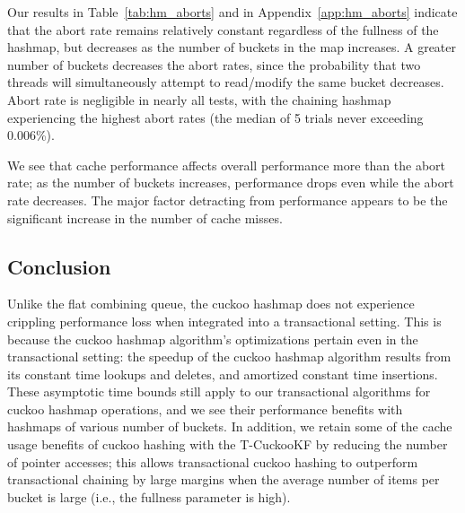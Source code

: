     Our results in Table~\ref{tab:hm_aborts} and in Appendix~\ref{app:hm_aborts} indicate that the abort rate remains relatively constant regardless of the fullness of the hashmap, but decreases as the number of buckets in the map increases. A greater number of buckets decreases the abort rates, since the probability that two threads will simultaneously attempt to read/modify the same bucket decreases. Abort rate is negligible in nearly all tests, with the chaining hashmap experiencing the highest abort rates (the median of 5 trials never exceeding 0.006\%).

We see that cache performance affects overall performance more than the abort rate; as the number of buckets increases, performance drops even while the abort rate decreases. The major factor detracting from performance appears to be the significant increase in the number of cache misses.

\vspace{12pt}
\noindent{}

\subsection{Conclusion}

Unlike the flat combining queue, the cuckoo hashmap does not experience crippling performance loss when integrated into a transactional setting. This is because the cuckoo hashmap algorithm's optimizations pertain even in the transactional setting: the speedup of the cuckoo hashmap algorithm results from its constant time lookups and deletes, and amortized constant time insertions. These asymptotic time bounds still apply to our transactional algorithms for cuckoo hashmap operations, and we see their performance benefits with hashmaps of various number of buckets. In addition, we retain some of the cache usage benefits of cuckoo hashing with the T-CuckooKF by reducing the number of pointer accesses; this allows transactional cuckoo hashing to outperform transactional chaining by large margins when the average number of items per bucket is large (i.e., the fullness parameter is high). 

